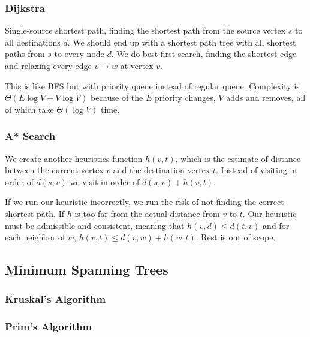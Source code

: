 \documentclass{article}
\begin{document}
\subsubsection{Dijkstra}
Single-source shortest path, finding the shortest path from the source vertex $s$ to all destinations $d$. We should end up with a shortest path tree with all shortest paths from $s$ to every node $d$. We do best first search, finding the shortest edge and relaxing every edge $v \to w$ at vertex $v$.

This is like BFS but with priority queue instead of regular queue. Complexity is $\Theta(E \log V + V \log V)$ because of the $E$ priority changes, $V$ adds and removes, all of which take $\Theta(\log V)$ time.
\subsubsection{A* Search}
We create another heuristics function $h(v, t)$, which is the estimate of distance between the current vertex $v$ and the destination vertex $t$. Instead of visiting in order of $d(s, v)$ we visit in order of $d(s, v) + h(v, t)$. 

If we run our heuristic incorrectly, we run the risk of not finding the correct shortest path. If $h$ is too far from the actual distance from $v$ to $t$. Our heuristic must be admissible and consistent, meaning that $h(v, d) \leq d(t, v)$ and for each neighbor of $w$, $h(v, t) \leq d(v, w) + h(w, t)$. Rest is out of scope.
\subsection{Minimum Spanning Trees}
\subsubsection{Kruskal's Algorithm}
\subsubsection{Prim's Algorithm}
\end{document}
